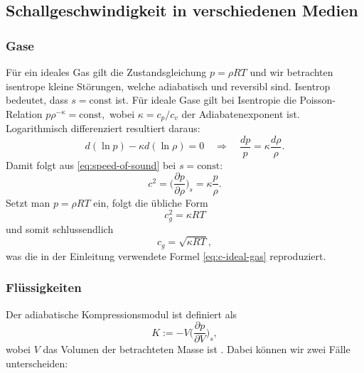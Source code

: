\subsection{Schallgeschwindigkeit in verschiedenen Medien}

\subsubsection{Gase}
Für ein ideales Gas gilt die Zustandsgleichung
\(
    p=\rho R T
\)
und wir betrachten isentrope kleine Störungen, welche adiabatisch und reversibl sind.
Isentrop bedeutet, dass \(s=\mathrm{const}\) ist.
Für ideale Gase gilt bei Isentropie die Poisson-Relation
\(
    p\rho^{-\kappa}=\mathrm{const},
\)
wobei \(\kappa=c_p/c_v\) der Adiabatenexponent ist.
Logarithmisch differenziert resultiert daraus:
\[
    d(\ln p) - \kappa d(\ln \rho) = 0
    \quad\Rightarrow\quad
    \frac{dp}{p} = \kappa\frac{d\rho}{\rho}.
\]
Damit folgt aus \eqref{eq:speed-of-sound} bei \(s=\mathrm{const}\):
\[
 c^2
=
    \biggl(\frac{\partial p}{\partial \rho}\biggr)_{s}
    = \kappa\frac{p}{\rho}.
\]
Setzt man \(p=\rho R T\) ein, folgt die übliche Form
\[
    c_g^2 = \kappa R T
\]
und somit schlussendlich
\begin{equation*}
    c_g=\sqrt{\kappa R T},
\end{equation*}
was die in der Einleitung verwendete Formel \eqref{eq:c-ideal-gas} reproduziert.

\subsubsection{Flüssigkeiten}

Der adiabatische Kompressionsmodul ist definiert als
%
\begin{equation}
  K := -V\biggl(\frac{\partial p}{\partial V}\biggr)_{s},
  \label{eq:def-bulk}
\end{equation}
wobei $V$ das Volumen der betrachteten Masse ist \cite{schall:will}.
Dabei können wir zwei Fälle unterscheiden:

